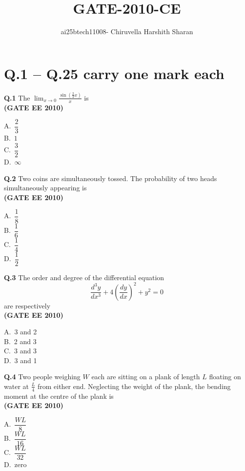 \documentclass[journal,12pt,onecolumn]{exam}
\title{\huge {GATE-2010-CE}}
\author{ai25btech11008- Chiruvella Harshith Sharan}
\theoremstyle{remark}
\begin{document}
\maketitle

\setlength{\parindent}{0pt}
\setlength{\parskip}{0.5cm}

\raggedright

\section*{Q.1 -- Q.25 carry one mark each}

\noindent\textbf{Q.1} The $\displaystyle \lim_{x \to 0} \frac{\sin \left( \frac{2}{3} x \right)}{x}$ is \\ \hfill\textbf{(GATE EE 2010)}
\begin{multicols}{4}
A.\ $\dfrac{2}{3}$ \\
B.\ $1$ \\
C.\ $\dfrac{3}{2}$ \\
D.\ $\infty$
\end{multicols}

\noindent\textbf{Q.2} Two coins are simultaneously tossed. The probability of two heads simultaneously appearing is\\ \hfill\textbf{(GATE EE 2010)}
\begin{multicols}{4}
A.\ $\dfrac{1}{8}$ \\
B.\ $\dfrac{1}{6}$ \\
C.\ $\dfrac{1}{4}$ \\
D.\ $\dfrac{1}{2}$
\end{multicols}

\noindent\textbf{Q.3} The order and degree of the differential equation 
\[
\frac{d^3 y}{dx^3} + 4 \left( \frac{dy}{dx} \right)^2 + y^2 = 0
\]
are respectively\\ \hfill\textbf{(GATE EE 2010)}
\begin{multicols}{4}
A.\ 3 and 2 \\
B.\ 2 and 3 \\
C.\ 3 and 3 \\
D.\ 3 and 1
\end{multicols}

\noindent\textbf{Q.4} Two people weighing $W$ each are sitting on a plank of length $L$ floating on water at $\frac{L}{4}$ from either end. Neglecting the weight of the plank, the bending moment at the centre of the plank is \\\hfill\textbf{(GATE EE 2010)}
\begin{multicols}{4}
A.\ $\dfrac{WL}{8}$ \\
B.\ $\dfrac{WL}{16}$ \\
C.\ $\dfrac{WL}{32}$ \\
D.\ zero
\end{multicols}
\end{document}
